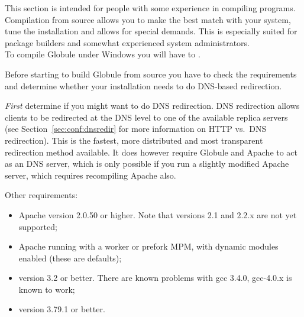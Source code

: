 \documentclass[10pt,a4paper]{article}
\makeatletter
\newenvironment{p}{\@open{P}{}}{\@close{P}}
\newenvironment{p}{}{\par}
\makeatother
\begin{document}

\begin{p}
This section is intended for people with some experience in compiling
programs.  Compilation from source allows you to make the best
match with your system, tune the installation and allows for special demands.
This is especially suited for package builders and somewhat experienced system
administrators. \\
To compile Globule under Windows you will have to
.
\end{p}

\begin{p}
Before starting to build Globule from source you have to check the
requirements and determine whether your installation needs to do DNS-based
redirection.
\end{p}

\begin{p}
\emph{First} determine if you might want to do DNS redirection.  DNS
redirection allows clients to be redirected at the DNS level to one of the
available replica servers (see Section~\ref{sec:conf:dnsredir} for more
information on HTTP vs.\ DNS redirection).  This is the fastest, more
distributed and most transparent redirection method available.  It does
however require Globule and Apache to act as an DNS server, which is only
possible if you run a slightly modified Apache server, which requires
recompiling Apache also.
\end{p}

\begin{p}
Other requirements:
\begin{itemize}
\item {} Apache version 2.0.50 or higher.
  Note that versions 2.1 and 2.2.x are not yet supported;
\item Apache running with a worker or prefork MPM, with dynamic modules
  enabled (these are defaults);
\item {} version 3.2 or better.
  There are known problems with gcc 3.4.0, gcc-4.0.x is known to work; 
\item {} version 3.79.1 or
  better.
\end{itemize}
\end{p}
\end{document}
